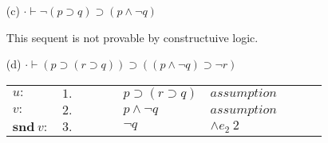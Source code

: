 \documentclass[11pt,a4paper]{article}
\begin{document}
\begin{itemize}
\begin{table}[H]
\begin{tabular}{*{10}{l}}
			\cline{4-9}
			
			$\lambda w . u(\textbf{inr} \ w):$ & $9.$ & \multicolumn{1}{|c}{} & & & $q \supset r$ & $\supset i \ 6$-$8$ & & & \multicolumn{1}{c|}{}\\
			
			$\langle \lambda v . u(\textbf{inl} \ v) , \lambda w . u(\textbf{inr} \ w) \rangle:$ & $10.$ & \multicolumn{1}{|c}{} & & & $(p \supset r) \land (q \supset r)$ & $\land i \ 5, 9$ & & & \multicolumn{1}{c|}{}\\
					
			\cline{3-10}
			
			$\lambda u . \langle \lambda v . u(\textbf{inl} \ v) , \lambda w . u(\textbf{inr} \ w) \rangle:$ & $11.$ & & & & $((p \vee q) \supset r) \supset ((p \supset r) \wedge (q \supset r))$ & $\supset i \ 1$-$10$ & & & \\
			
		\end{tabular}
		\end{table}
		
		\[ \boxed{\lambda u . \langle \lambda v . u(\textbf{inl} \ v) , \lambda w . u(\textbf{inr} \ w) \rangle} \]
		
		
\item[(c)]
$\cdot\vdash \neg (p \supset q) \supset (p \wedge \neg q) $

This sequent is not provable by constructuive logic.

\item[(d)]
$\cdot\vdash (p \supset (r \supset q)) \supset ((p \wedge \neg q) \supset \neg r)$
		\begin{table}[H]
		\centering
		\begin{tabular}{*{10}{l}}
			
			\cline{3-10}
			
			$u:$ & $1.$ &\multicolumn{1}{|c}{} & & & $p \supset (r \supset q)$ & $assumption$ & & &\multicolumn{1}{c|}{}\\
			
			\cline{4-9}
			
			$v:$ & $2.$ & \multicolumn{1}{|c}{} & \multicolumn{1}{|c}{} &  & $p \land \neg q$ & $assumption$ & & \multicolumn{1}{c|}{} &\multicolumn{1}{c|}{}\\
			
			$\textbf{snd} \ v:$ & $3.$ & \multicolumn{1}{|c}{} & \multicolumn{1}{|c}{} &  & $\neg q$ & $\land e_2 \ 2$ & & \multicolumn{1}{c|}{} &\multicolumn{1}{c|}{}\\
			

\end{tabular}
\end{table}
\end{itemize}
\end{document}
